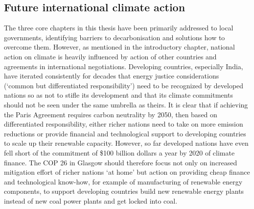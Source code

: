 \documentclass[../thesis.tex]{subfiles}
\begin{document}
\subsection{Future international climate action}
The three core chapters in this thesis have been primarily addressed to local governments, identifying barriers to decarbonisation and solutions how to overcome them. However, as mentioned in the introductory chapter, national action on climate is heavily influenced by action of other countries and agreements in international negotiations. Developing countries, especially India, have iterated consistently for decades that energy justice considerations (`common but differentiated responsibility') need to be recognized by developed nations so as not to stifle its development and that its climate commitments should not be seen under the same umbrella as theirs. It is clear that if achieving the Paris Agreement requires carbon neutrality by 2050, then based on differentiated responsibility, either richer nations need to take on more emission reductions or provide financial and technological support to developing countries to scale up their renewable capacity. However, so far developed nations have even fell short of the commitment of \$100 billion dollars a year by 2020 of climate finance. The COP 26 in Glasgow should therefore focus not only on increased mitigation effort of richer nations `at home' but action on providing cheap finance and technological know-how, for example of manufacturing of renewable energy components, to support developing countries build new renewable energy plants instead of new coal power plants and get locked into coal.
\end{document}
